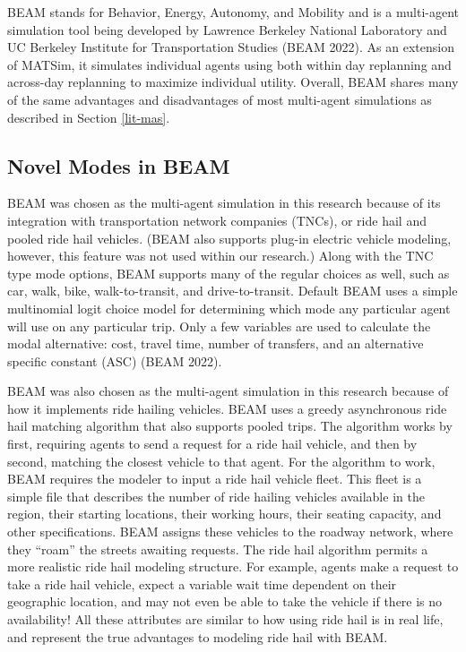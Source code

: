 \documentclass[12pt, oneside, openright]{byuthesis}
\begin{document}
BEAM stands for Behavior, Energy, Autonomy, and Mobility and is a multi-agent simulation tool being developed by Lawrence Berkeley National Laboratory and UC Berkeley Institute for Transportation Studies (BEAM 2022). As an extension of MATSim, it simulates individual agents using both within day replanning and across-day replanning to maximize individual utility. Overall, BEAM shares many of the same advantages and disadvantages of most multi-agent simulations as described in Section \ref{lit-mas}.

\hypertarget{novel-beam}{%
\subsection{Novel Modes in BEAM}\label{novel-beam}}

BEAM was chosen as the multi-agent simulation in this research because of its integration with transportation network companies (TNCs), or ride hail and pooled ride hail vehicles. (BEAM also supports plug-in electric vehicle modeling, however, this feature was not used within our research.) Along with the TNC type mode options, BEAM supports many of the regular choices as well, such as car, walk, bike, walk-to-transit, and drive-to-transit. Default BEAM uses a simple multinomial logit choice model for determining which mode any particular agent will use on any particular trip. Only a few variables are used to calculate the modal alternative: cost, travel time, number of transfers, and an alternative specific constant (ASC) (BEAM 2022).

BEAM was also chosen as the multi-agent simulation in this research because of how it implements ride hailing vehicles. BEAM uses a greedy asynchronous ride hail matching algorithm that also supports pooled trips. The algorithm works by first, requiring agents to send a request for a ride hail vehicle, and then by second, matching the closest vehicle to that agent. For the algorithm to work, BEAM requires the modeler to input a ride hail vehicle fleet. This fleet is a simple file that describes the number of ride hailing vehicles available in the region, their starting locations, their working hours, their seating capacity, and other specifications. BEAM assigns these vehicles to the roadway network, where they ``roam'' the streets awaiting requests. The ride hail algorithm permits a more realistic ride hail modeling structure. For example, agents make a request to take a ride hail vehicle, expect a variable wait time dependent on their geographic location, and may not even be able to take the vehicle if there is no availability! All these attributes are similar to how using ride hail is in real life, and represent the true advantages to modeling ride hail with BEAM.
\end{document}
